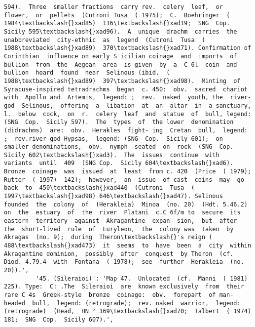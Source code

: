 \documentclass[11pt]{article}
\begin{document}
\begin{Verbatim}[commandchars=\\\{\}]
594).  Three  smaller fractions  carry rev.  celery  leaf,  or  flower,  or  pellets  (Cutroni Tusa  ( 1975);  C.  Boehringer  ( 1984\textbackslash{}xad85)  116\textbackslash{}xad19;  SNG  Cop.  Sicily 595\textbackslash{}xad96).  A  unique  drachm  carries  the  unabbreviated  city-ethnic  as  legend  (Cutroni  Tusa  ( 1988\textbackslash{}xad89)  370\textbackslash{}xad71). Confirmation of  Corinthian  influence on early S icilian coinage  and  imports  of  bullion  from  the  Aegean  area  is given  by  a  C 6l  coin  and  bullion  hoard  found  near  Selinous (ibid.  ( 1988\textbackslash{}xad89)  397\textbackslash{}xad98).  Minting  of  Syracuse-inspired tetradrachms  began  c. 450:  obv.  sacred  chariot  with  Apollo and  Artemis,  legend: ;  rev.  naked  youth, the  river-god  Selinous,  offering  a  libation  at  an  altar  in  a sanctuary,  l.  below  cock,  on  r.  celery  leaf  and  statue  of  bull, legend: (SNG  Cop.  Sicily 597).  The  types  of  the lower  denomination  (didrachms)  are:  obv.  Herakles  fight- ing  Cretan  bull,  legend: ;  rev.river-god Hypsas,  legend: (SNG  Cop.  Sicily 601);  on  smaller denominations,  obv.  nymph  seated  on  rock  (SNG  Cop.  Sicily 602\textbackslash{}xad3).  The  issues  continue  with  variants  until  409  (SNG Cop.  Sicily 604\textbackslash{}xad6).  Bronze  coinage  was  issued  at  least  from c. 420  (Price  ( 1979);  Rutter  ( 1997)  142);  however,  an  issue  of cast  coins  may  go  back  to  450\textbackslash{}xad440  (Cutroni  Tusa  ( 1997\textbackslash{}xad98) 646\textbackslash{}xad47). Selinous  founded  the  colony  of  (Herakleia)  Minoa  (no. 20)  (Hdt. 5.46.2)  on  the  estuary  of  the  river  Platani  c.C 6f/m to  secure  its  eastern  territory  against  Akragantine  expan- sion,  but  after  the  short-lived  rule  of  Euryleon,  the  colony was  taken  by  Akragas  (no. 9);  during  Theron\textbackslash{}'s reign ( 488\textbackslash{}xad473)  it  seems  to  have  been  a  city  within  Akragantine dominion,  possibly  after  conquest  by Theron  (cf.  Diod. 4.79.4  with  Fontana  ( 1978);  see  further  Herakleia  (no. 20)).',
         '45. (Sileraioi)': 'Map 47.  Unlocated  (cf.  Manni  ( 1981)  225). Type:  C: .The  Sileraioi  are  known exclusively  from  their rare C 4s  Greek-style  bronze  coinage:  obv.  forepart  of man-headed  bull,  legend: (retrograde);  rev. naked  warrior,  legend: (retrograde)  (Head,  HN ² 169\textbackslash{}xad70;  Talbert  ( 1974)  181;  SNG  Cop.  Sicily 607).',

\end{Verbatim}
\end{document}

